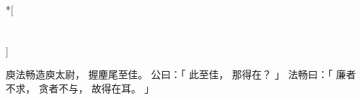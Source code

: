 
\switchcolumn[0]*[\section{}]

庾法畅造庾太尉，
握麈尾至佳。
公曰：「
    此至佳，
    那得在？
」
法畅曰：「
    廉者不求，
    贪者不与，
    故得在耳。
」

\switchcolumn


